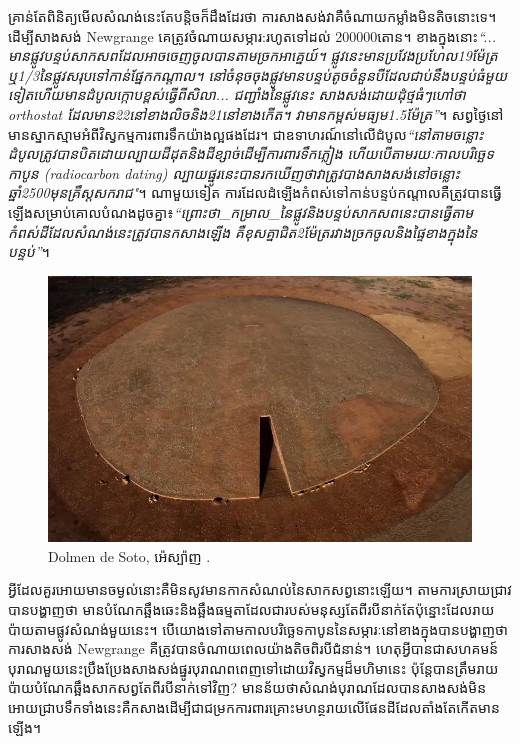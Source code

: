 \documentclass[10pt,twocolumn,letterpaper]{article}
\begin{document}
គ្រាន់តែពិនិត្យមើលសំណង់នេះតែបន្តិចក៏ដឹងដែរថា ការសាងសង់វាគឺចំណាយកម្លាំងមិនតិចនោះទេ។ ដើម្បីសាងសង់ Newgrange គេត្រូវចំណាយសម្ភារ:រហូតទៅដល់ 200000តោន។ ខាងក្នុងនោះ\textit{“... មានផ្លូវបន្ទប់សាកសពដែលអាចចេញចូលបានតាមច្រកអាគ្នេយ៍។ ផ្លូវនេះមានប្រវែងប្រហែល19ម៉ែត្រ ឬ1/3នៃផ្លូវសរុបទៅកាន់ផ្នែកកណ្ដាល។ នៅចំនុចចុងផ្លូវមានបន្ទប់តូចចំនួនបីដែលជាប់នឹងបន្ទប់ធំមួយទៀតហើយមានដំបូលក្កោបខ្ពស់ធ្វើពីសិលា... ជញ្ជាំងនៃផ្លូវនេះ សាងសង់ដោយដុំថ្មធំៗហៅថា orthostat ដែលមាន22នៅខាងលិចនិង21នៅខាងកើត។ វាមានកម្ពស់មធ្យម1.5ម៉ែត្រ”}\cite{70}។ សព្វថ្ងៃនៅមានស្នាកស្មាមអំពីវិស្វកម្មការពារទឹកយ៉ាងល្អផងដែរ។ ជាឧទាហរណ៍នៅលើដំបូល\textit{“នៅតាមចន្លោះដំបូលត្រូវបានបិតដោយល្បាយដីដុតនិងដីខ្សាច់ដើម្បីការពារទឹកភ្លៀង ហើយបើតាមរយៈកាលបរិច្ឆេទកាបូន (radiocarbon dating) ល្បាយផ្នូរនេះបានរកឃើញថាវាត្រូវបាងសាងសង់នៅចន្លោះឆ្នាំ2500មុនគ្រឹស្តសករាជ"}\cite{71}។ ណាមួយទៀត ការដែលដំឡើងកំពស់ទៅកាន់បន្ទប់កណ្តាលគឺត្រូវបានធ្វើឡើងសម្រាប់គោលបំណងដូចគ្នា៖\textit{“ព្រោះថា\_កម្រាល\_នៃផ្លូវនិងបន្ទប់សាកសពនេះបានធ្វើតាមកំពស់ដីដែលសំណង់នេះត្រូវបានកសាងឡើង គឺខុសគ្នាជិត2ម៉ែត្ររវាងច្រកចូលនិងផ្ទៃខាងក្នុងនៃបន្ទប់”}\cite{71}។

\begin{figure}[b]
\begin{center}
   \includegraphics[width=1\linewidth]{dolmen.jpg}
\end{center}
   \caption{Dolmen de Soto, អ៉េស្ប៉ាញ \cite{53}.}
\label{fig:9}
\label{fig:onecol}
\end{figure}

អ្វីដែលគួរអោយមានចម្ងល់នោះគឺមិនសូវមានកាកសំណល់នៃសាកសព្វនោះឡើយ។ តាមការស្រាយជ្រាវបានបង្ហាញថា មានបំណែកឆ្អឹងឆេះនិងឆ្អឹងធម្មតាដែលជារបស់មនុស្សតែពីរបីនាក់តែប៉ុន្នោះដែលរាយប៉ាយតាមផ្លូវសំណង់មួយនេះ។ បើយោងទៅតាមកាលបរិច្ឆេទកាបូននៃសម្ភារៈនៅខាងក្នុងបានបង្ហាញថា ការសាងសង់ Newgrange គឺត្រូវបានចំណាយពេលយ៉ាងតិចពិរបីជំនាន់។ ហេតុអ្វីបានជាសហគមន៍បុរាណមួយនេះប្រឹងប្រែងសាងសង់ផ្នូរបុរាណពពេញទៅដោយវិស្វកម្មដ៏មហិមានេះ ប៉ុន្តែបានត្រឹមរាយប៉ាយបំណែកឆ្អឹងសាកសព្វតែពីរបីនាក់ទៅវិញ? មានន័យថាសំណង់បុរាណដែលបានសាងសង់មិនអោយជ្រាបទឹកទាំងនេះគឺកសាងដើម្បីជាជម្រកការពារគ្រោះមហន្ថរាយលើផែនដីដែលតាំងតែកើតមានឡើង។
\end{document}
